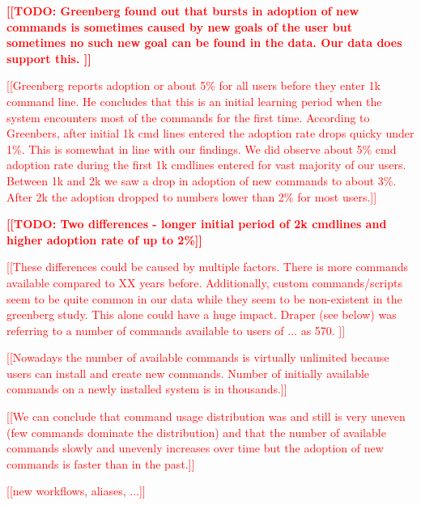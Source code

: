 \documentclass[thesis=M,english]{FITthesis}[2012/10/20]
\newcommand{\todotext}[1]{\textcolor{red}{\textbf{[[#1]]}}}
\newcommand{\redtext}[1]{\textcolor{red}{[[#1]]}}
\begin{document}
\todotext{TODO: Greenberg found out that bursts in adoption of new commands is sometimes caused by new goals of the user but sometimes no such new goal can be found in the data. Our data does support this. }

\redtext{Greenberg reports adoption or about 5\% for all users before they enter 1k command line. He concludes that this is an initial learning period when the system encounters most of the commands for the first time. According to Greenbers, after initial 1k cmd lines entered the adoption rate drops quicky under 1\%. This is somewhat in line with our findings. We did observe about 5\% cmd adoption rate during the first 1k cmdlines entered for vast majority of our users. Between 1k and 2k we saw a drop in adoption of new commands to about 3\%. After 2k the adoption dropped to numbers lower than 2\% for most users.}

\todotext{TODO: Two differences - longer initial period of 2k cmdlines and higher adoption rate of up to 2\%}

\redtext{These differences could be caused by multiple factors. There is more commands available compared to XX years before. Additionally, custom commands/scripts seem to be quite common in our data while they seem to be non-existent in the greenberg study. This alone could have a huge impact. Draper (see below) was referring to a number of commands available to users of ... as 570. }

\redtext{Nowadays the number of available commands is virtually unlimited because users can install and create new commands. Number of initially available commands on a newly installed system is in thousands.}


\redtext{We can conclude that command usage distribution was and still is very uneven (few commands dominate the distribution) and that the number of available commands slowly and unevenly increases over time but the adoption of new commands is faster than in the past.}

\redtext{new workflows, aliases, ...}
\end{document}
